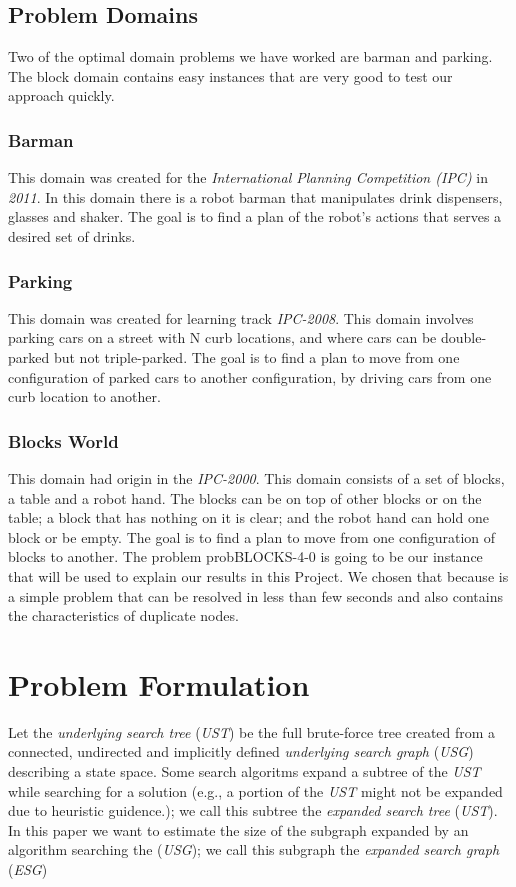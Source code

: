 \documentclass[11pt,a4paper,oneside]{report}
\begin{document}
\subsection{Problem Domains}
Two of the optimal domain problems we have worked are barman and parking. The block domain contains easy instances that are very good to test our approach quickly.

\subsubsection{Barman}
This domain was created for the \textit{International Planning Competition (IPC)} in \textit{2011}. In this domain there is a robot barman that manipulates drink dispensers, glasses and shaker. The goal is to find a plan of the robot's actions that serves a desired set of drinks.

\subsubsection{Parking}
This domain was created for learning track \textit{IPC-2008}. This domain involves parking cars on a street with N curb locations, and where cars can be double-parked but not triple-parked. The goal is to find a plan to move from one configuration of parked cars to another configuration, by driving cars from one curb location to another. 

\subsubsection{Blocks World}
This domain had origin in the \textit{IPC-2000}. This domain consists of a set of blocks, a table and a robot hand. The blocks can be on top of other blocks or on the table; a block that has nothing on it is clear; and the robot hand can hold one block or be empty. The goal is to find a plan to move from one configuration of blocks to another. The problem probBLOCKS-4-0 is going to be our instance that will be used to explain our results in this Project. We chosen that because is a simple problem that can be resolved in less than few seconds and also contains the characteristics of duplicate nodes.

\section{Problem Formulation}
Let the \textit{underlying search tree} (\textit{UST}) be the full brute-force tree created from a connected, undirected and implicitly defined \textit{underlying search graph} (\textit{USG}) describing a state space. Some search algoritms expand a subtree of the \textit{UST} while searching for a solution (e.g., a portion of the \textit{UST} might not be expanded due to heuristic guidence.); we call this subtree the \textit{expanded search tree} (\textit{UST}). In this paper we want to estimate the size of the subgraph expanded by an algorithm searching the (\textit{USG}); we call this subgraph the \textit{expanded search graph} (\textit{ESG})
\end{document}
